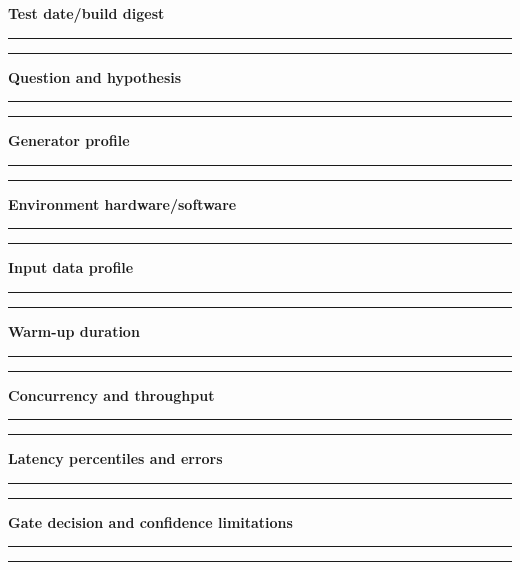 \documentclass[10pt,letterpaper]{article}
\begin{document}
\textbf{Test date/build digest}\par
\noindent\rule{\linewidth}{0.35pt}\par\vspace{0.7em}
\noindent\rule{\linewidth}{0.35pt}\par\vspace{0.7em}
\textbf{Question and hypothesis}\par
\noindent\rule{\linewidth}{0.35pt}\par\vspace{0.7em}
\noindent\rule{\linewidth}{0.35pt}\par\vspace{0.7em}
\textbf{Generator profile}\par
\noindent\rule{\linewidth}{0.35pt}\par\vspace{0.7em}
\noindent\rule{\linewidth}{0.35pt}\par\vspace{0.7em}
\textbf{Environment hardware/software}\par
\noindent\rule{\linewidth}{0.35pt}\par\vspace{0.7em}
\noindent\rule{\linewidth}{0.35pt}\par\vspace{0.7em}
\textbf{Input data profile}\par
\noindent\rule{\linewidth}{0.35pt}\par\vspace{0.7em}
\noindent\rule{\linewidth}{0.35pt}\par\vspace{0.7em}
\textbf{Warm-up duration}\par
\noindent\rule{\linewidth}{0.35pt}\par\vspace{0.7em}
\noindent\rule{\linewidth}{0.35pt}\par\vspace{0.7em}
\textbf{Concurrency and throughput}\par
\noindent\rule{\linewidth}{0.35pt}\par\vspace{0.7em}
\noindent\rule{\linewidth}{0.35pt}\par\vspace{0.7em}
\textbf{Latency percentiles and errors}\par
\noindent\rule{\linewidth}{0.35pt}\par\vspace{0.7em}
\noindent\rule{\linewidth}{0.35pt}\par\vspace{0.7em}
\textbf{Gate decision and confidence limitations}\par
\noindent\rule{\linewidth}{0.35pt}\par\vspace{0.7em}
\noindent\rule{\linewidth}{0.35pt}\par\vspace{0.7em}
\end{document}
